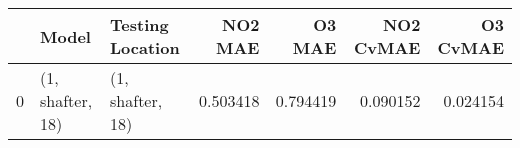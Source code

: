 \begin{tabular}{lllrrrr}
\toprule
{} &             Model &  Testing Location &   NO2 MAE &    O3 MAE &  NO2 CvMAE &  O3 CvMAE \\
\midrule
0 &  (1, shafter, 18) &  (1, shafter, 18) &  0.503418 &  0.794419 &   0.090152 &  0.024154 \\
\bottomrule
\end{tabular}
